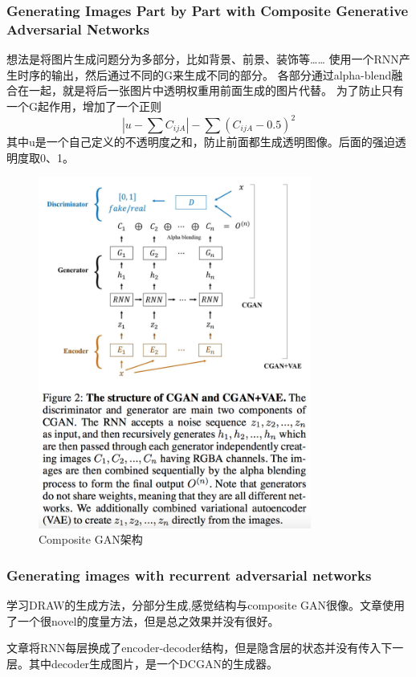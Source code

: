 \documentclass[a4paper]{article}
\begin{document}
\subsubsection{Generating Images Part by Part with Composite Generative Adversarial Networks\cite{DBLP:journals/corr/KwakZ16}}
想法是将图片生成问题分为多部分，比如背景、前景、装饰等……
使用一个RNN产生时序的输出，然后通过不同的G来生成不同的部分。
各部分通过alpha-blend融合在一起，就是将后一张图片中透明权重用前面生成的图片代替。
为了防止只有一个G起作用，增加了一个正则
$$|u - \sum C_{ijA}|-\sum (C_{ijA}-0.5)^2$$
其中u是一个自己定义的不透明度之和，防止前面都生成透明图像。后面的强迫透明度取0、1。
\begin{figure}
\centering
\includegraphics[width=0.8\textwidth]{./img/21.png}
\caption{Composite GAN架构}
\label{fig:21}
\end{figure}
\subsubsection{Generating images with recurrent adversarial networks\cite{gran}}
学习DRAW的生成方法，分部分生成,感觉结构与composite GAN很像。文章使用了一个很novel的度量方法，但是总之效果并没有很好。

文章将RNN每层换成了encoder-decoder结构，但是隐含层的状态并没有传入下一层。其中decoder生成图片，是一个DCGAN的生成器。
\end{document}
